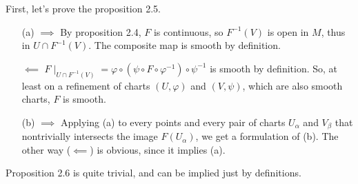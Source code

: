 \documentclass[a4paper]{article}
\begin{document}
\begin{note}[on ex. 2.7]
    First, let's prove the proposition 2.5.
    \begin{itemize}[topsep=0pt]
        \item[(a)] $\implies$ By proposition 2.4, $F$ is continuous, so $F^{-1} (V)$ is open in $M$,
            thus in $U \cap F^{-1} \left( V \right) $. The composite map is
            smooth by definition.

        $\impliedby$ $F\mid_{U \cap F^{-1} (V)} = \varphi \circ \left( \psi \circ F \circ \varphi^{-1} \right) \circ \psi^{-1}$
            is smooth by definition. So, at least on a refinement of charts
            $(U, \varphi)$ and $(V, \psi)$, which are also smooth charts, $F$ is smooth.

        \item[(b)] $\implies$ Applying (a) to every points and every pair of charts
            $U_\alpha$ and $V_\beta$ that nontrivially intersects the image $F(U_\alpha)$,
            we get a formulation of (b). The other way ($\impliedby$) is obvious,
            since it implies (a).
    \end{itemize}
    Proposition 2.6 is quite trivial, and can be implied just by definitions.
\end{note}
\end{document}
